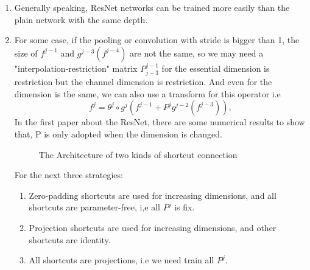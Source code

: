 \begin{enumerate}
\item Generally speaking, ResNet networks can be trained more easily than the plain network with the same depth.

\item For some case, if the pooling or convolution with stride is bigger than 1, the size of $f^{j-1}$ and $g^{j-3}(f^{j-4})$ are not the same, so we may need a "interpolation-restriction" matrix $P_{j-3}^{j-1}$ for the essential dimension is restriction but the channel dimension is restriction. And even for the dimension is the same, we can also use a transform for this operator i.e
\begin{equation}
f^j = \theta^j \circ g^j(f^{j-1} + P^jg^{j-2}(f^{j-3}) ),
\end{equation}
In the first paper about the ResNet, there are some numerical results to show that, P is only adopted when the dimension is changed.
\begin{figure}[!htb]
	\caption{The Architecture of two kinds of shortcut connection}      
	\label{LeNet-5}
\end{figure}

For the next three strategies:
\begin{enumerate}
\item Zero-padding shortcuts are used for increasing dimensions, and all shortcuts are parameter-free, i,e all $P^j$ is fix.
\item Projection shortcuts are used for increasing dimensions, and other shortcuts are identity.
\item All shortcuts are projections, i.e we need train all $P^j$.
\end{enumerate}



\end{enumerate}
